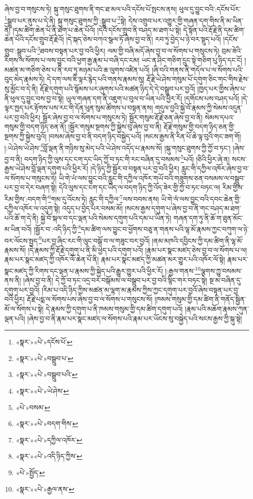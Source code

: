 ཞེས་བྱ་བ་གསུངས་ཏེ། སྐུ་གསུང་ཐུགས་ནི་གང་ཐ་མལ་པའི་དངོས་པོ་སྤངས་ནས། ཕུལ་དུ་བྱུང་བའི་:དངོས་པོར་\footnote{«སྣར་»«པེ་»དངོས་པོ་}སྒྲུབ་པར་ནུས་པ་དེ་ནི། སྐུ་གསུང་ཐུགས་ཀྱི་:སྒྲུབ་པ་\footnote{«སྣར་»«པེ་»བསྒྲུབ་པ་}སྟེ། དེས་འགྲུབ་པར་འགྱུར་གྱི་གཞན་དག་གིས་ནི་མ་ཡིན་ནོ། །དམ་ཚིག་ཆེན་པོ་ནི་ཐེག་པ་ཆེན་པོའོ། །དེའི་དངོས་གྲུབ་ནི་བཤད་མ་ཐག་པ་སྟེ། དེ་སྟོན་པའི་རྡོ་རྗེ་ནི་དམ་ཚིག་ཆེན་པོའི་དངོས་གྲུབ་རྡོ་རྗེའོ། །དེ་སྐད་ཅེས་བཀའ་སྩལ་ཏོ་ཞེས་བྱ་བ་ནི། རབ་ཏུ་བྱེད་པ་ཉེ་བར་སྡུད་པའོ། །དངོས་གྲུབ་:སྒྲུབ་པའི་\footnote{«སྣར་»«པེ་»བསྒྲུབ་པའི་}ཐབས་བསྟན་པར་བྱ་བའི་ཕྱིར། ལམ་གྱི་བཞི་མདོ་ཞེས་བྱ་བ་ལ་སོགས་པ་གསུངས་ཏེ། བྲམ་ཟེའི་རིགས་ལ་སོགས་པ་ལས་བྱུང་བའི་ཕྱག་རྒྱ་རྣམ་པ་བཞི་དང་ངམ། ཡང་ན་ཤིང་གཅིག་དྲུང་སྟེ་གཅིག་པུ་ཉིད་དང་ངོ། །མཚན་མ་གཅིག་ཅེས་པ་ནི་རབ་ཏུ་མཉམ་པའི་ཆ་ལུགས་འཛིན་པའོ། །ཞི་བའི་གནས་ནི་གདོལ་པ་ལ་སོགས་པའི་བུད་མེད་རྣམས་ཏེ། དེ་དག་ལས་ཇི་ལྟར་རྙེད་པའི་གནས་རྣམས་སུ། རྡོ་རྗེ་ཡེ་ཤེས་གསུམ་པོ་དགུག་ཅིང་གང་གིས་རྗེས་སུ་མྱོང་བ་དེ་ནི། རྡོ་རྗེ་དགུག་པའི་སྙོམས་པར་ཞུགས་པའི་མཚན་ཉིད་དེ་དེ་བསྒྲུབ་པར་བྱའོ། །ཁྱད་པར་གྱིས་ཞེས་པ་ནི་ཕུལ་དུ་བྱུང་བས་བྱ་བ་སྟེ། ཡུལ་གཞན་དག་ནི་འཇུག་པ་བུལ་བ་ཡིན་པའི་ཕྱིར་རོ། །དགོངས་པས་བཤད་པའོ། །དེ་ལྟར་ཁྱད་པར་རྟོགས་པས་རང་གི་དོན་ཕུན་སུམ་ཚོགས་པ་བསྟན་ནས། གདུལ་བྱའི་སྐྱེ་བོ་རྣམས་ཀྱི་སེམས་འདུན་པར་བྱ་བའི་ཕྱིར། སྦྱོར་ཞེས་བྱ་བ་ལ་སོགས་པ་གསུངས་ཏེ། སྦྱོར་གསུམ་རྡོ་རྗེ་ཅན་ཞེས་བྱ་བ་ནི། སེམས་དཔའ་གསུམ་གྱི་བདག་ཉིད་ཅན་ནོ། །སྦྱོར་གསུམ་སྔགས་ཀྱི་སྐྱེས་བུ་ཞེས་བྱ་བ་ནི། རྡོ་རྗེ་གསུམ་གྱི་བདག་ཉིད་ཅན་གྱི་སྔགས་ཀྱི་སྐྱེས་བུའོ། །བསམ་ཞེས་བྱ་བ་ནི་བདག་ཉིད་བསྐྱེད་པའོ། །སངས་རྒྱས་ནི་རིན་པོ་ཆེ་ལྟ་བུའི་གང་ཟག་གོ། །:ཡེ་ཤེས་ཡེ་ཤེས་\footnote{«སྣར་»«པེ་»ཡེ་ཤེས་}བློ་ལྡན་ནི་གཉིས་སུ་མེད་པའི་ཡེ་ཤེས་འདོད་པ་རྣམས་སོ། །སྐུ་གསུང་ཐུགས་ཀྱི་ཀྱོ་བ་ཏང་། །ཞེས་བྱ་བ་ནི། བདག་ཉིད་ཀྱི་ལུས་དང་ངག་དང་ཡིད་ཀྱོ་བ་ཏང་གི་རང་བཞིན་དུ་བསམས་\footnote{«པེ་»བསམ་}པའོ། །ཅིའི་ཕྱིར་ཞེ་ན། སངས་རྒྱས་ཡེ་ཤེས་བློ་ལྡན་དགུག་པའི་ཕྱིར་རོ། །དེ་ཉིད་ཀྱི་སྦྱོར་བ་བསྟན་པར་བྱ་བའི་ཕྱིར། རླུང་གི་དཀྱིལ་འཁོར་ཞེས་བྱ་བ་ལ་སོགས་པ་གསུངས་ཏེ། ཡི་གེ་ཡཾ་ལས་བྱུང་བའི་རླུང་གི་དཀྱིལ་འཁོར་གཡོ་བའི་གཟུགས་ཅན་བསམས་ལ་བསྒྲུབ་པར་བྱ་བ་དེར་བཞག་སྟེ། དེའི་ལུས་དང་ངག་དང་ཡིད་ལ་བདག་ཉིད་ཀྱི་འོད་ཟེར་གྱི་ཀྱོ་བ་ཏང་བཏང་ལ། རིམ་གྱིས་རིམ་གྱིས་:བདག་གི་\footnote{«སྣར་»«པེ་»བདག་གིས་}གམ་དུ་འོངས་ཏེ། རླུང་གི་དཀྱིལ་\footnote{«སྣར་»«པེ་»དཀྱིལ་འཁོར་}ལས་བབས་ནས། ཡི་གེ་ལཾ་ལས་བྱུང་བའི་དབང་ཆེན་གྱི་དཀྱིལ་འཁོར་ལ་འདུག་སྟེ། འདུད་པ་བྱེད་པར་བསམ་མོ། །སངས་རྒྱས་དགུག་པ་ཞེས་བྱ་བ་ནི་གང་བཤད་མ་ཐག་པའི་ཆོ་ག་དེ་ནི། སྐྱེ་བོ་སྐལ་བ་དང་ལྡན་པའི་སེམས་དགུག་པའི་དམ་པ་ཡིན་ཏེ། གཞན་དག་ཏུ་ནི་ཆོ་ག་ཐུན་མོང་མ་ཡིན་བའོ། །སྦྱོར་བ་:འདི་ཉིད་ཀྱི་\footnote{«སྣར་»«པེ་»འདི་ཉིད་ཀྱིས་}དམ་ཚིག་ལས་བྱུང་བ་ཕྱོགས་བཅུ་ན་གནས་པའི་ལྷ་མོ་རྣམས་ཀྱང་བཀུག་ལ་ཉེ་བར་ལོངས་སྤྱད་\footnote{«པེ་»སྤྱོད་}པར་བྱ་ཞིང་རང་གི་ལུང་བསྒོ་བ་ལ་གཟུང་བར་བྱའོ། །ནམ་མཁའི་དབྱིངས་ཀྱི་དམ་ཚིག་ནི་ལྷ་མོ་རྣམས་སོ། །དེ་རྣམས་ཀྱི་རྡོ་རྗེ་དགུག་པ་ནི་མི་ཕྱེད་པའི་དགུག་པའོ། །རྣམ་པར་སྣང་མཛད་ཅེས་བྱ་བ་ལ་སོགས་པ་ལ། རྣམ་པར་སྣང་མཛད་ཀྱི་འཁོར་ལོ་ཆེན་པོ་ནི། རྣམ་པར་སྣང་མཛད་ཀྱི་མཚན་མར་གྱུར་པའི་འཁོར་ལོ་སྟེ། རྣམ་པར་སྣང་མཛད་ཀྱི་རིགས་དང་ལྡན་པ་རྣམས་ཀྱི་སྐྱེད་པའི་རྒྱུར་གྱུར་པའི་ཕྱིར་རོ། །:རྒྱལ་གནས་\footnote{«སྣར་»«པེ་»རྒྱལ་ནས་}ལྕགས་ཀྱུ་བསམས་ནས་ནི། །ཞེས་བྱ་བ་ནི། དེ་ཀྱོ་བ་ཏང་འདྲ་བར་བསྒོམས་ལ་བསྒྲུབ་པར་བྱ་བའི་སྙིང་གར་བཏང་སྟེ། སྔ་མ་བཞིན་དུ་དགུག་པར་བྱའོ། །རིམ་པ་འདི་ཉིད་ཀྱིས་མཚན་མ་ལྷག་མ་རྣམས་ཀྱིས་ཀྱང་དགུག་པར་བྱའོ་ཞེས་བསྟན་པར་བྱ་བའི་ཕྱིར། རྡོ་རྗེ་པདྨ་ལ་སོགས་པས་ཞེས་བྱ་བ་ལ་སོགས་པ་གསུངས་སོ། །ཁམས་གསུམ་གྱི་དམ་ཚིག་ནི་གནོད་སྦྱིན་མོ་ལ་སོགས་པ་སྟེ། དེ་རྣམས་ཀྱི་དགུག་པ་ནི་ཁམས་གསུམ་གྱི་དམ་ཚིག་དགུག་པའོ། །རྣམ་པའི་མཆོག་རྣམས་ཀུན་ལྡན་པའི། །ཞེས་བྱ་བ་ནི་རྣམ་པར་སྣང་མཛད་ལ་སོགས་པའི་རྣམ་པར་ཡོངས་སུ་བསྐྱེད་པའི་སངས་རྒྱས་ཀྱི་སྐུ་སྟེ། 